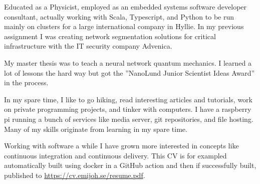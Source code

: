 

Educated as a Physicist, employed as an embedded systems software developer
consultant, actually working with Scala, Typescript, and Python to be run
mainly on clusters for a large international company in Hyllie. In my previous
assignment I was creating network segmentation solutions for critical
infrastructure with the IT security company Advenica.

My master thesis was to teach a neural network quantum mechanics. I learned a
lot of lessons the hard way but got the ”NanoLund Junior Scientist Ideas
Award” in the process.

In my spare time, I like to go hiking, read interesting articles and
tutorials, work on private programming projects, and tinker with computers. I
have a raspberry pi running a bunch of services like media server, git
repositories, and file hosting. Many of my skills originate from learning in
my spare time.

Working with software a while I have grown more interested in concepts like
continuous integration and continuous delivery. This CV is for exampled
automatically built using docker in a GitHub action and then if successfully
built, published to \url{https://cv.emijoh.se/resume.pdf}.
